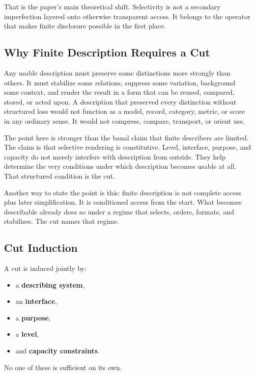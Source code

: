 \documentclass[11pt]{article}
\begin{document}
That is the paper's main theoretical shift. Selectivity is not a secondary imperfection layered onto otherwise transparent access. It belongs to the operator that makes finite disclosure possible in the first place.

\subsection{Why Finite Description Requires a Cut}

Any usable description must preserve some distinctions more strongly than others. It must stabilize some relations, suppress some variation, background some context, and render the result in a form that can be reused, compared, stored, or acted upon. A description that preserved every distinction without structured loss would not function as a model, record, category, metric, or score in any ordinary sense. It would not compress, compare, transport, or orient use.

The point here is stronger than the banal claim that finite describers are limited. The claim is that selective rendering is constitutive. Level, interface, purpose, and capacity do not merely interfere with description from outside. They help determine the very conditions under which description becomes usable at all. That structured condition is the cut.

Another way to state the point is this: finite description is not complete access plus later simplification. It is conditioned access from the start. What becomes describable already does so under a regime that selects, orders, formats, and stabilizes. The cut names that regime.

\subsection{Cut Induction}

A cut is induced jointly by:
\begin{itemize}
    \item a \textbf{describing system},
    \item an \textbf{interface},
    \item a \textbf{purpose},
    \item a \textbf{level},
    \item and \textbf{capacity constraints}.
\end{itemize}

No one of these is sufficient on its own.
\end{document}
